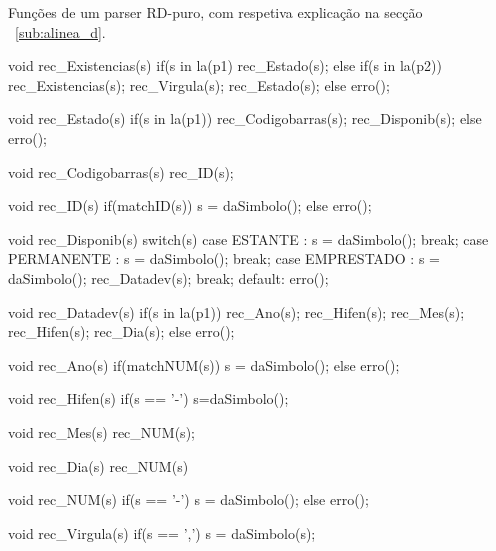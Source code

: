 Funções de um parser RD-puro, com respetiva explicação na secção ~\ref{sub:alinea_d}.

\begin{spverbatim}
void rec_Existencias(s){
	if(s in la(p1){
		rec_Estado(s);
	}else if(s in la(p2)){
		rec_Existencias(s);
		rec_Virgula(s);
		rec_Estado(s);
	}else{
		erro();
	}
}

void rec_Estado(s){
	if(s in la(p1)){
		rec_Codigobarras(s);
		rec_Disponib(s);
	}else{
		erro();
	}
}

void rec_Codigobarras(s){
	rec_ID(s);
}

void rec_ID(s){
	if(matchID(s)){
		s = daSimbolo();
	}else{
		erro();
	}
}

void rec_Disponib(s){
	switch(s){
		case ESTANTE :
			s = daSimbolo();
			break;
		case PERMANENTE :
			s = daSimbolo();
			break;
		case EMPRESTADO :
			s = daSimbolo();
			rec_Datadev(s);
			break;
		default:
			erro();
	}
}

void rec_Datadev(s){
	if(s in la(p1)){
		rec_Ano(s);
		rec_Hifen(s);
		rec_Mes(s);
		rec_Hifen(s);
		rec_Dia(s);
	}else{
		erro();
	}
}

void rec_Ano(s){
	if(matchNUM(s)){
		s = daSimbolo();
	}else{
		erro();
	}
}

void rec_Hifen(s){
	if(s == '-'){
		s=daSimbolo();
	}
}

void rec_Mes(s){
	rec_NUM(s);
}

void rec_Dia(s){
	rec_NUM(s)
}


void rec_NUM(s){
	if(s == '-'){
		s = daSimbolo();
	}else{
		erro();
	}
}

void rec_Virgula(s){
	if(s == ','){
		s = daSimbolo(s);
	}
}

\end{spverbatim}

